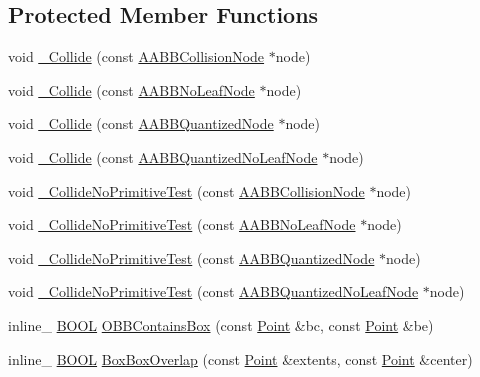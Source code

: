 \subsection*{Protected Member Functions}
\begin{DoxyCompactItemize}
\item 
void \hyperlink{class_o_b_b_collider_a7990bab5c0031bcb1f9ff91e0784fb89}{\+\_\+\+Collide} (const \hyperlink{class_a_a_b_b_collision_node}{A\+A\+B\+B\+Collision\+Node} $\ast$node)
\item 
void \hyperlink{class_o_b_b_collider_a8a0b06aac794cf0beeaf2f4655319f2b}{\+\_\+\+Collide} (const \hyperlink{class_a_a_b_b_no_leaf_node}{A\+A\+B\+B\+No\+Leaf\+Node} $\ast$node)
\item 
void \hyperlink{class_o_b_b_collider_a9b112aeac7f0ec4475a7257359c038d7}{\+\_\+\+Collide} (const \hyperlink{class_a_a_b_b_quantized_node}{A\+A\+B\+B\+Quantized\+Node} $\ast$node)
\item 
void \hyperlink{class_o_b_b_collider_a03ade2e5058bc111c4595a1bfc2001bb}{\+\_\+\+Collide} (const \hyperlink{class_a_a_b_b_quantized_no_leaf_node}{A\+A\+B\+B\+Quantized\+No\+Leaf\+Node} $\ast$node)
\item 
void \hyperlink{class_o_b_b_collider_a452f93a41ae9e7d0fa1b691cdf149841}{\+\_\+\+Collide\+No\+Primitive\+Test} (const \hyperlink{class_a_a_b_b_collision_node}{A\+A\+B\+B\+Collision\+Node} $\ast$node)
\item 
void \hyperlink{class_o_b_b_collider_a17db250fb7683f36dec64773d347a759}{\+\_\+\+Collide\+No\+Primitive\+Test} (const \hyperlink{class_a_a_b_b_no_leaf_node}{A\+A\+B\+B\+No\+Leaf\+Node} $\ast$node)
\item 
void \hyperlink{class_o_b_b_collider_a0914b34907f08b5e7861737e10de573c}{\+\_\+\+Collide\+No\+Primitive\+Test} (const \hyperlink{class_a_a_b_b_quantized_node}{A\+A\+B\+B\+Quantized\+Node} $\ast$node)
\item 
void \hyperlink{class_o_b_b_collider_a2b02ebe38b171892c5b8372171b8a7bc}{\+\_\+\+Collide\+No\+Primitive\+Test} (const \hyperlink{class_a_a_b_b_quantized_no_leaf_node}{A\+A\+B\+B\+Quantized\+No\+Leaf\+Node} $\ast$node)
\item 
inline\+\_\+ \hyperlink{_ice_types_8h_a050c65e107f0c828f856a231f4b4e788}{B\+O\+O\+L} \hyperlink{class_o_b_b_collider_a0f9acb8c2122ff46b420af36f7b625a5}{O\+B\+B\+Contains\+Box} (const \hyperlink{class_point}{Point} \&bc, const \hyperlink{class_point}{Point} \&be)
\item 
\hypertarget{class_o_b_b_collider_a63fbe7758467d8b29fdd3c6e8da22824}{inline\+\_\+ \hyperlink{_ice_types_8h_a050c65e107f0c828f856a231f4b4e788}{B\+O\+O\+L} \hyperlink{class_o_b_b_collider_a63fbe7758467d8b29fdd3c6e8da22824}{Box\+Box\+Overlap} (const \hyperlink{class_point}{Point} \&extents, const \hyperlink{class_point}{Point} \&center)}\label{class_o_b_b_collider_a63fbe7758467d8b29fdd3c6e8da22824}


\end{DoxyCompactItemize}
